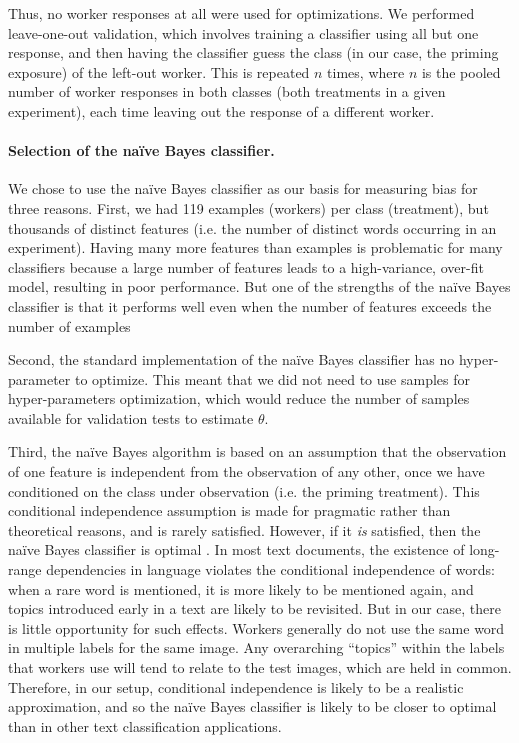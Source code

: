 \documentclass{sigchi}
\begin{document}
	Thus, no worker responses at all were used for optimizations.  We 
	performed 
	leave-one-out validation, which involves training a classifier using 
	all but one response, and then having the classifier guess the class
	(in our case, the priming exposure) of the left-out worker.  This is 
	repeated $n$ times, where $n$ is the pooled number of worker responses 
	in both
	classes (both treatments in a given experiment), 
	each time leaving out the response of a different worker.

\paragraph{Selection of the na\"ive Bayes classifier.}
We chose to use the na\"ive Bayes classifier as our basis for measuring 
bias for three reasons.  First, we had 119 examples (workers) per class 
(treatment), but thousands of distinct features 
(i.e. the number of distinct words occurring in an experiment).  
Having many more features than examples is problematic for many classifiers
because a large number of features leads to a high-variance, over-fit model,
resulting in poor performance.  But one of the strengths of the na\"ive 
Bayes classifier is that it performs well even when the number of features
exceeds the number of examples\cite{bickel2004, hastie2009elements}

Second, the standard implementation of the na\"ive Bayes classifier has no 
hyper-parameter to optimize. This meant that we did not need to use 
samples for hyper-parameters optimization, which would reduce the number
of samples available for validation tests to estimate $\theta$.

Third, the na\"ive Bayes algorithm is based on an assumption that the 
observation of one feature is independent from the observation of any 
other, once we have conditioned on the class under observation 
(i.e. the priming treatment).  This
conditional independence assumption is made for
pragmatic rather than theoretical reasons, and is rarely satisfied.  However,
if it \textit{is} satisfied, then the na\"ive Bayes classifier is 
optimal \cite{Zhang2004562}.  In most text documents, 
the existence of long-range dependencies in language 
violates the conditional independence of words: when a rare word is mentioned,
it is more likely to be mentioned again, and topics introduced early in a
text are likely to be revisited.
But in our case, there is little opportunity for such effects.  Workers 
generally do not use the same word in multiple labels for the same image. 
Any overarching ``topics'' within the labels that workers use will tend to 
relate to the test images, which are held in common.
Therefore, in our setup, conditional independence is likely to be 
a realistic approximation, and so the na\"ive Bayes classifier is likely to
be closer to optimal than in other text classification applications.
\end{document}
